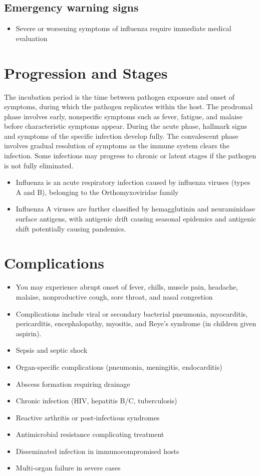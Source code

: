\subsection{Emergency warning signs}
\begin{itemize}[noitemsep]
  \item Severe or worsening symptoms of influenza require immediate medical evaluation
\end{itemize}
\section{Progression and Stages}
The incubation period is the time between pathogen exposure and onset of symptoms, during which the pathogen replicates within the host. The prodromal phase involves early, nonspecific symptoms such as fever, fatigue, and malaise before characteristic symptoms appear. During the acute phase, hallmark signs and symptoms of the specific infection develop fully. The convalescent phase involves gradual resolution of symptoms as the immune system clears the infection. Some infections may progress to chronic or latent stages if the pathogen is not fully eliminated.

\begin{itemize}[noitemsep]
  \item Influenza is an acute respiratory infection caused by influenza viruses (types A and B), belonging to the Orthomyxoviridae family
  \item Influenza A viruses are further classified by hemagglutinin and neuraminidase surface antigens, with antigenic drift causing seasonal epidemics and antigenic shift potentially causing pandemics.
\end{itemize}
\section{Complications}
\begin{itemize}[noitemsep]
  \item You may experience abrupt onset of fever, chills, muscle pain, headache, malaise, nonproductive cough, sore throat, and nasal congestion
  \item Complications include viral or secondary bacterial pneumonia, myocarditis, pericarditis, encephalopathy, myositis, and Reye's syndrome (in children given aspirin).
  \item Sepsis and septic shock
  \item Organ-specific complications (pneumonia, meningitis, endocarditis)
  \item Abscess formation requiring drainage
  \item Chronic infection (HIV, hepatitis B/C, tuberculosis)
  \item Reactive arthritis or post-infectious syndromes
  \item Antimicrobial resistance complicating treatment
  \item Disseminated infection in immunocompromised hosts
  \item Multi-organ failure in severe cases
\end{itemize}

